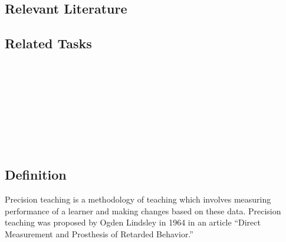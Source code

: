 \subsection{Relevant Literature}
\begin{refsection}
\nocite{test,alang2017police,clayton2018black}
\printbibliography[heading=none]
\end{refsection}
%
\subsection{Related Tasks}
\fouraSeven{}\\
\fourdThree{}\\
\fourdEight{}\\
\fourjTwo{}\\
\fourjEleven{}\\
\fourjTwelve{}\\
\fourjFourteen{}\\
%
%
%
%
%
%
\section{\fourfFour{}}
\subsection{Definition}
Precision teaching is a methodology of teaching which involves measuring performance of a learner and making changes based on these data. Precision teaching was proposed by Ogden Lindsley in 1964 in an article ``Direct Measurement and Prosthesis of Retarded Behavior.'' 

